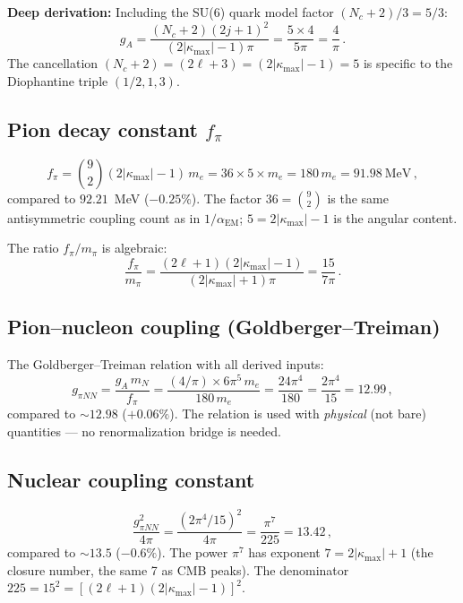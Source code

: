 \documentclass[11pt,letterpaper]{article}
\numberwithin{equation}{section}
\begin{document}
\textbf{Deep derivation:}  Including the SU(6) quark model factor
$(N_c + 2)/3 = 5/3$:
\begin{equation}
  g_A = \frac{(N_c+2)(2j+1)^2}{(2|\kappa_\mathrm{max}|-1)\pi}
  = \frac{5 \times 4}{5\pi} = \frac{4}{\pi}\,.
\end{equation}
The cancellation $(N_c + 2) = (2\ell + 3) = (2|\kappa_\mathrm{max}|-1) = 5$
is specific to the Diophantine triple $(1/2, 1, 3)$.

\subsection{Pion decay constant $f_\pi$}

\begin{equation}\label{eq:fpi}
  f_\pi = \binom{9}{2}(2|\kappa_\mathrm{max}|-1)\,m_e
  = 36 \times 5 \times m_e = 180\,m_e = 91.98~\text{MeV}\,,
\end{equation}
compared to $92.21$~MeV ($-0.25\%$).  The factor $36 = \binom{9}{2}$
is the same antisymmetric coupling count as in $1/\alpha_\mathrm{EM}$;
$5 = 2|\kappa_\mathrm{max}|-1$ is the angular content.

The ratio $f_\pi/m_\pi$ is algebraic:
\begin{equation}
  \frac{f_\pi}{m_\pi}
  = \frac{(2\ell+1)(2|\kappa_\mathrm{max}|-1)}{(2|\kappa_\mathrm{max}|+1)\pi}
  = \frac{15}{7\pi}\,.
\end{equation}

\subsection{Pion--nucleon coupling (Goldberger--Treiman)}

The Goldberger--Treiman relation with all derived inputs:
\begin{equation}\label{eq:gpiNN}
  g_{\pi NN} = \frac{g_A\,m_N}{f_\pi}
  = \frac{(4/\pi) \times 6\pi^5\,m_e}{180\,m_e}
  = \frac{24\pi^4}{180} = \frac{2\pi^4}{15} = 12.99\,,
\end{equation}
compared to $\sim\!12.98$ ($+0.06\%$).  The relation is used with
\emph{physical} (not bare) quantities --- no renormalization bridge
is needed.

\subsection{Nuclear coupling constant}

\begin{equation}\label{eq:g2}
  \frac{g^2_{\pi NN}}{4\pi}
  = \frac{(2\pi^4/15)^2}{4\pi}
  = \frac{\pi^7}{225} = 13.42\,,
\end{equation}
compared to $\sim\!13.5$ ($-0.6\%$).  The power $\pi^7$ has exponent
$7 = 2|\kappa_\mathrm{max}| + 1$ (the closure number, the same 7 as
CMB peaks).  The denominator $225 = 15^2 = [(2\ell+1)(2|\kappa_\mathrm{max}|-1)]^2$.
\end{document}
